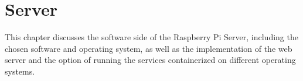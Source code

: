 \chapter{Server}  \label{sec:raspberry_pi}
This chapter discusses the software side of the Raspberry Pi Server,
including the chosen software and operating system, as well 
as the implementation of the web server and the option of running the
services containerized on different operating systems.
    





    
    

    